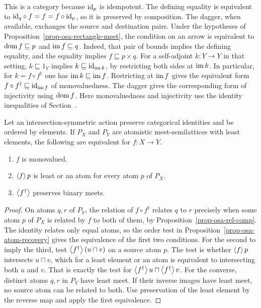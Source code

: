 This is a category because ${\operatorname{id}}_p$ is idempotent. The defining equality
is equivalent to ${\operatorname{id}}_q\circ f=f=f\circ{\operatorname{id}}_p$, so it is preserved by
composition. The dagger, when available, exchanges the source and
destination pairs. Under the hypotheses of
Proposition~\ref{prop-osa-rectangle-meet}, the condition on an arrow
is equivalent to $\operatorname{dom} f\sqsubseteq p$ and $\operatorname{im} f\sqsubseteq q$.
Indeed, that pair of bounds implies the defining equality, and the
equality implies $f\sqsubseteq p\times q$. For a self-adjoint
$k:Y\to Y$ in that setting, $k\sqsubseteq 1_Y$ implies
$k\sqsubseteq{\operatorname{id}}_{\operatorname{im} k}$, by restricting both sides at $\operatorname{im} k$.
In particular, for $k=f\circ f^\dagger$ one has
$\operatorname{im} k\sqsubseteq\operatorname{im} f$. Restricting at $\operatorname{im} f$ gives the equivalent
form $f\circ f^\dagger\sqsubseteq{\operatorname{id}}_{\operatorname{im} f}$ of monovaluedness.
The dagger gives the corresponding form of injectivity using $\operatorname{dom} f$.
Here monovaluedness and injectivity use the identity inequalities of
Section~.

\begin{prop}\label{prop-osa-monovalued-atoms}
Let an intersection-symmetric action preserve categorical identities
and be ordered by elements. If $P_X$ and $P_Y$ are atomistic
meet-semilattices with least elements, the following are equivalent
for $f:X\to Y$.
\begin{enumerate}
\item $f$ is monovalued.
\item $\left\langle f\right\rangle p$ is least or an atom for every atom $p$ of $P_X$.
\item $\left\langle f^\dagger\right\rangle$ preserves binary meets.
\end{enumerate}
\end{prop}

\begin{proof}
On atoms $q,r$ of $P_Y$, the relation of $f\circ f^\dagger$ relates
$q$ to $r$ precisely when some atom $p$ of $P_X$ is related by $f$
to both of them, by Proposition~\ref{prop-osa-rel-comp}. The identity
relates only equal atoms, so the order test in
Proposition~\ref{prop-osa-atom-recovery} gives the equivalence of the
first two conditions. For the second to imply the third, test
$\left\langle f^\dagger\right\rangle(u\sqcap v)$ on a source atom $p$.
The test is whether $\left\langle f\right\rangle p$ intersects $u\sqcap v$, which
for a least element or an atom is equivalent to intersecting both
$u$ and $v$. That is exactly the test for
$\left\langle f^\dagger\right\rangle u\sqcap\left\langle f^\dagger\right\rangle v$. For the converse,
distinct atoms $q,r$ in $P_Y$ have least meet. If their inverse
images have least meet, no source atom can be related to both.
Use preservation of the least element by the reverse map and
apply the first equivalence.
\end{proof}

